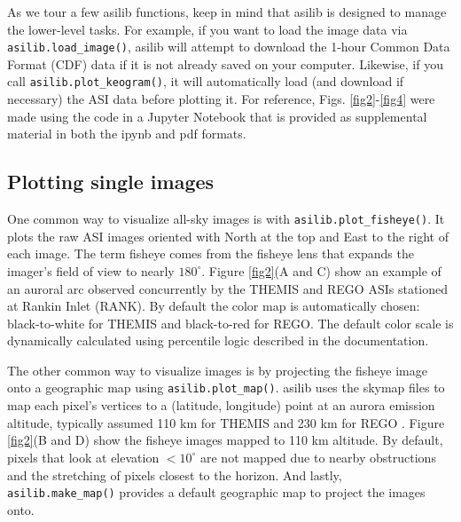 \documentclass[utf8]{FrontiersinHarvard} %
\begin{document}
As we tour a few asilib functions, keep in mind that asilib is designed to manage the lower-level tasks. For example, if you want to load the image data via \verb|asilib.load_image()|, asilib will attempt to download the 1-hour Common Data Format (CDF) data if it is not already saved on your computer. Likewise, if you call \verb|asilib.plot_keogram()|, it will automatically load (and download if necessary) the ASI data before plotting it. For reference, Figs. \ref{fig2}-\ref{fig4} were made using the code in a Jupyter Notebook that is provided as supplemental material in both the ipynb and pdf formats.

\subsection{Plotting single images}
One common way to visualize all-sky images is with \verb|asilib.plot_fisheye()|. It plots the raw ASI images oriented with North at the top and East to the right of each image. The term fisheye comes from the fisheye lens that expands the imager's field of view to nearly $180^\circ$. Figure \ref{fig2}(A and C) show an example of an auroral arc observed concurrently by the THEMIS and REGO ASIs stationed at Rankin Inlet (RANK). By default the color map is automatically chosen: black-to-white for THEMIS and black-to-red for REGO. The default color scale is dynamically calculated using percentile logic described in the documentation.

The other common way to visualize images is by projecting the fisheye image onto a geographic map using \verb|asilib.plot_map()|. asilib uses the skymap files to map each pixel's vertices to a (latitude, longitude) point at an aurora emission altitude, typically assumed 110 km for THEMIS and 230 km for REGO \citep{Donovan2006, Liang2016}. Figure \ref{fig2}(B and D) show the fisheye images mapped to 110 km altitude. By default, pixels that look at elevation $< 10^\circ$ are not mapped due to nearby obstructions and the stretching of pixels closest to the horizon. And lastly, \verb|asilib.make_map()| provides a default geographic map to project the images onto.
\end{document}
